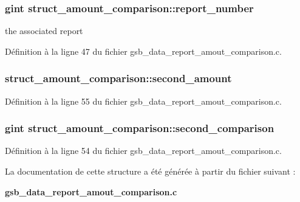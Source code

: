 \subsubsection[{report\_\-number}]{\setlength{\rightskip}{0pt plus 5cm}gint {\bf struct\_\-amount\_\-comparison::report\_\-number}}\label{structstruct__amount__comparison_ac5770ad9064216783487dedf5e1a15d4}
the associated report 

Définition à la ligne 47 du fichier gsb\_\-data\_\-report\_\-amout\_\-comparison.c.

\subsubsection[{second\_\-amount}]{ {\bf struct\_\-amount\_\-comparison::second\_\-amount}}\label{structstruct__amount__comparison_a56563d4b9978fbb21df4d79333d27333}


Définition à la ligne 55 du fichier gsb\_\-data\_\-report\_\-amout\_\-comparison.c.

\subsubsection[{second\_\-comparison}]{\setlength{\rightskip}{0pt plus 5cm}gint {\bf struct\_\-amount\_\-comparison::second\_\-comparison}}\label{structstruct__amount__comparison_aae6b117ef657170b48bbddfe57ebbe48}


Définition à la ligne 54 du fichier gsb\_\-data\_\-report\_\-amout\_\-comparison.c.



La documentation de cette structure a été générée à partir du fichier suivant :\begin{DoxyCompactItemize}
\item 
{\bf gsb\_\-data\_\-report\_\-amout\_\-comparison.c}\end{DoxyCompactItemize}

